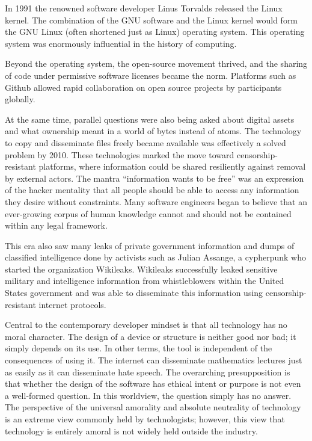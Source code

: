 In 1991 the renowned software developer Linus Torvalds released the Linux
kernel. The combination of the GNU software and the Linux kernel would form the
GNU Linux (often shortened just as Linux) operating system. This operating
system was enormously influential in the history of computing.

Beyond the operating system, the open-source movement thrived, and the sharing
of code under permissive software licenses became the norm. Platforms such as
Github allowed rapid collaboration on open source projects by participants
globally.

At the same time, parallel questions were also being asked about digital assets
and what ownership meant in a world of bytes instead of atoms. The technology to
copy and disseminate files freely became available was effectively a solved
problem by 2010. These technologies marked the move toward censorship-resistant
platforms, where information could be shared resiliently against removal by
external actors. The mantra ``information wants to be free'' was an expression of
the hacker mentality that all people should be able to access any information
they desire without constraints. Many software engineers began to believe that
an ever-growing corpus of human knowledge cannot and should not be contained
within any legal framework.

This era also saw many leaks of private government information and dumps of
classified intelligence done by activists such as Julian Assange, a cypherpunk
who started the organization Wikileaks. Wikileaks successfully leaked sensitive
military and intelligence information from whistleblowers within the United
States government and was able to disseminate this information using
censorship-resistant internet protocols.


Central to the contemporary developer mindset is that all technology has no
moral character. The design of a device or structure is neither good nor bad; it
simply depends on its use. In other terms, the tool is independent of the
consequences of using it. The internet can disseminate mathematics lectures just
as easily as it can disseminate hate speech. The overarching presupposition is
that whether the design of the software has ethical intent or purpose is not
even a well-formed question. In this worldview, the question simply has no
answer. The perspective of the universal amorality and absolute neutrality of
technology is an extreme view commonly held by technologists; however, this view
that technology is entirely amoral is not widely held outside the industry.

